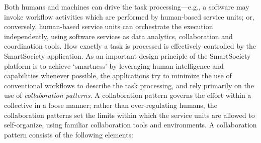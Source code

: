 \documentclass{llncs}
\begin{document}
      Both humans and machines can drive the task processing---e.g., a software may invoke workflow activities which are performed by  human-based service units; or, conversely, human-based service units can orchestrate the execution independently, using software services as data analytics, collaboration and coordination tools.
      How exactly a task is processed is effectively controlled by the SmartSociety application.  As an important design principle of the SmartSociety platform is to achieve `smartness' by leveraging human intelligence and capabilities whenever possible, the applications try to minimize the use of conventional workflows to describe the task processing, and rely primarily on the use of \emph{collaboration patterns}. 
      A collaboration pattern governs the effort within a collective in a loose manner; rather than over-regulating humans, the collaboration patterns set the limits within which the service units are allowed to self-organize, using familiar collaboration tools and environments. 
      A collaboration pattern consists of the following elements:
\end{document}
